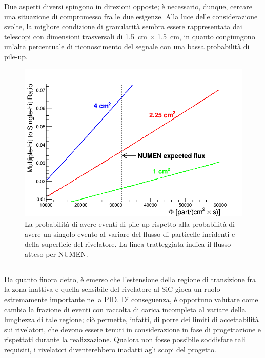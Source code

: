 Due aspetti diversi spingono in direzioni opposte; è necessario, dunque, cercare una situazione di compromesso fra le due esigenze.
Alla luce delle considerazione svolte, la migliore condizione di granularità sembra essere rappresentata dai telescopi con dimensioni trasversali di 1.5~cm $\times$ 1.5~cm, in quanto congiungono un'alta percentuale di riconoscimento del segnale con una bassa probabilità di pile-up.


\begin{figure} [!t]
	\centering
	\includegraphics[width=\textwidth, keepaspectratio]{Grafici_Tesi/Granularita/pile-up_label2.png}
	\caption{La probabilità di avere eventi di pile-up rispetto alla probabilità di avere un singolo evento al variare del flusso di particelle incidenti e della superficie del rivelatore. La linea tratteggiata indica il flusso atteso per NUMEN.} \label{fig:pile-up}
\end{figure}


\subsection{}

Da quanto finora detto, è emerso che l'estensione della regione di transizione fra la zona inattiva e quella sensibile del rivelatore al SiC gioca un ruolo estremamente importante nella PID.
Di conseguenza, è opportuno valutare come cambia la frazione di eventi con raccolta di carica incompleta al variare della lunghezza di tale regione; 
ciò permette, infatti, di porre dei limiti di accettabilità sui rivelatori, che devono essere tenuti in considerazione in fase di progettazione e rispettati durante la realizzazione.
Qualora non fosse possibile soddisfare tali requisiti, i rivelatori diventerebbero inadatti agli scopi del progetto.


